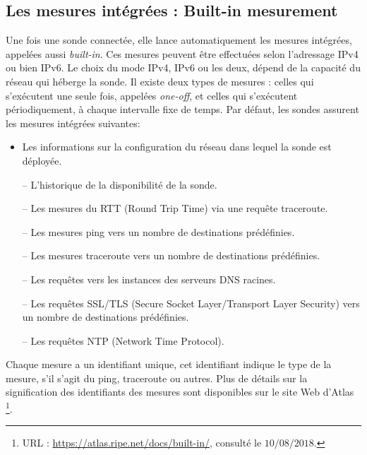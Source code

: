 \subsection{Les mesures intégrées : Built-in mesurement } \label{par:whatmesureripeatlas}
Une fois une sonde  connectée, elle lance automatiquement les mesures intégrées, appelées aussi \textit{built-in}. Ces mesures peuvent être effectuées selon l'adressage IPv4 ou bien IPv6. Le choix du mode  IPv4,  IPv6 ou les deux, dépend de la capacité du réseau qui héberge la sonde.  Il existe deux types de mesures :  celles qui   s'exécutent une seule fois, appelées  \textit{one-off}, et celles qui s'exécutent   périodiquement, à chaque intervalle fixe de temps. 
Par défaut, les sondes  assurent les mesures intégrées  suivantes: 
\begin{itemize}
	\item Les informations sur la configuration du réseau dans lequel la sonde  est déployée.
	\item[--] L'historique de la disponibilité de la sonde.
	\item[--] Les mesures du  RTT (Round Trip Time) via une requête traceroute.
	\item[--] Les mesures ping vers un nombre de destinations prédéfinies.
	\item[--] Les mesures traceroute vers un nombre de destinations prédéfinies.
	\item[--] Les requêtes vers les instances des serveurs DNS  racines.
	\item[--] Les requêtes SSL/TLS (Secure Socket Layer/Transport Layer Security) vers un nombre de destinations prédéfinies.
	\item[--] Les requêtes NTP (Network Time Protocol).
\end{itemize}

Chaque mesure a un identifiant  unique, cet identifiant indique le type de la mesure, s'il s'agit du ping, traceroute ou autres. Plus de détails sur la signification des identifiants des mesures sont disponibles sur le site Web d'Atlas \footnote{URL : \url{https://atlas.ripe.net/docs/built-in/}, consulté le $10/08/2018$.}.
